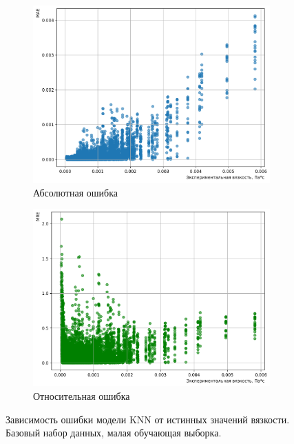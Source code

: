 \documentclass[a4paper,12pt]{article}
\begin{document}
      \begin{figure}[ht!]
        \centering
        \begin{subfigure}{0.48\textwidth}
            \centering
            \includegraphics[width=\linewidth]{knn/MAE_KNN (k=3)_0.8_base.png}
            \caption{Абсолютная ошибка}
        \end{subfigure}
        \hfill
        \begin{subfigure}{0.48\textwidth}
            \centering
            \includegraphics[width=\linewidth]{knn/MRE_KNN (k=3)_0.8_base.png}
            \caption{Относительная ошибка}
        \end{subfigure}
        \caption{Зависимость ошибки модели KNN от истинных значений вязкости. Базовый набор данных, малая обучающая выборка.}
        \label{fig:knn_errors_08_base}
      \end{figure}
      
\end{document}
